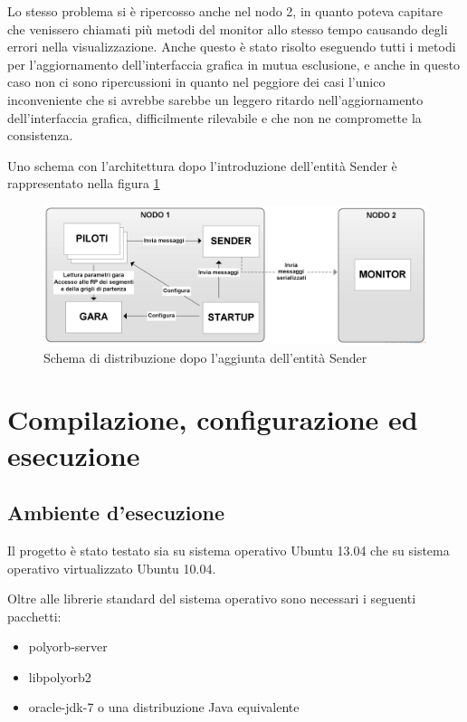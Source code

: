 \documentclass[a4paper,11pt, twoside]{book}
\begin{document}
      Lo stesso problema si è ripercosso anche nel nodo 2, in quanto poteva capitare che venissero chiamati
      più metodi del monitor allo stesso tempo causando degli errori nella visualizzazione.
      Anche questo è stato risolto eseguendo tutti i metodi per l'aggiornamento dell'interfaccia grafica in mutua esclusione,
      e anche in questo caso non ci sono ripercussioni in quanto nel peggiore dei casi l'unico inconveniente che si avrebbe sarebbe
      un leggero ritardo nell'aggiornamento dell'interfaccia grafica, difficilmente rilevabile e che non ne compromette
      la consistenza.
      
      Uno schema con l'architettura dopo l'introduzione dell'entità Sender è rappresentato nella 
      figura \ref{Fig:SchemaDistribuzioneSender}
      
      \begin{figure}[ht]
	\centering
	\includegraphics[width=120mm]{./Immagini/SchemaDistribuzioneSender.png}
	\caption{Schema di distribuzione dopo l'aggiunta dell'entità Sender}
	\label{Fig:SchemaDistribuzioneSender}
      \end{figure}      
      
  \chapter{Compilazione, configurazione ed esecuzione}
    \section{Ambiente d'esecuzione}
      Il progetto è stato testato sia su sistema operativo Ubuntu 13.04 che su sistema operativo virtualizzato Ubuntu 10.04.
      
      Oltre alle librerie standard del sistema operativo sono necessari i seguenti pacchetti:
      \begin{itemize}
        \item polyorb-server
	\item libpolyorb2
	\item oracle-jdk-7 o una distribuzione Java equivalente
      \end{itemize}
\end{document}
